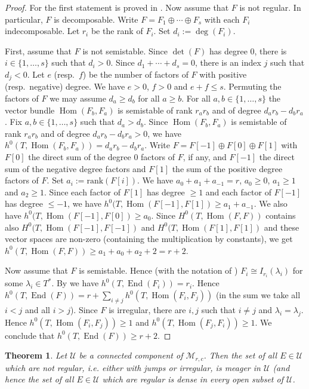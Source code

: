 \documentclass[letterpaper,10pt]{amsart}
\theoremstyle{plain}
\newtheorem{theorem}{Theorem}[]
\theoremstyle{definition}
\newcommand{\enm}[1]{\ensuremath{#1}}          %
\newcommand{\op}[1]{\operatorname{#1}}
\newcommand{\cal}[1]{\mathcal{#1}}
\newcommand{\Mm}{\enm{\cal{M}}}
\newcommand{\Uu}{\enm{\cal{U}}}
\newcommand{\Hom}{\op{Hom}}
\newcommand{\End}{\op{End}}
\begin{document}
\begin{proof}
For the first statement is proved in \cite[Lem.]{FMW}. Now assume that $F$ is not regular. In particular, $F$ is decomposable. Write $F=F_1\oplus \cdots \oplus F_s$ with each $F_i$ indecomposable. Let $r_i$ be the rank of $F_i$. Set $d_i:= \deg(F_i)$. 

First, assume that $F$ is not semistable. Since $\det(F)$ has degree $0$, there is $i\in \{1,\dots,s\}$ such that $d_i>0$. Since $d_1+\cdots +d_s=0$, there is an index $j$ such that $d_j<0$. Let $e$ (resp.~$f$) be the number of factors of $F$ with positive (resp.~negative) degree. We have $e>0$, $f>0$ and $e+f\le s$. 
Permuting the factors of $F$ we may assume $d_a\ge d_b$ for all $a\ge b$. For all $a, b\in \{1,\dots,s\}$ the vector bundle $\Hom(F_b,F_a)$ is semistable of rank $r_ar_b$ and of degree $d_ar_b -d_br_a$. Fix $a,b\in \{1,\dots ,s\}$ such that $d_a>d_b$. Since $\Hom(F_b,F_a)$ is semistable of rank $r_ar_b$ and of degree $d_ar_b -d_br_a>0$, we have $h^0(T,\Hom(F_b,F_a)) =d_ar_b-d_br_a$. Write $F =F[-1]\oplus F[0]\oplus F[1]$ with $F[0]$ the direct sum of the degree $0$ factors of $F$, if any, and $F[-1]$ the direct sum of the negative degree factors and $F[1]$ the sum of the positive degree factors of $F$. Set $a_i:= \mathrm{rank}(F[i])$. We have $a_0+a_1+a_{-1}=r$, $a_0\ge 0$, $a_1\ge 1$ and $a_2\ge 1$. Since each factor of $F[1]$ has degree $\ge 1$ and each factor of $F[-1]$ has degree $\le -1$, we have $h^0(T,\Hom(F[-1],F[1]) \ge a_1+a_{-1}$. We also have $h^0(T,\Hom(F[-1],F[0]) \ge a_0$. Since $H^0(T,\Hom(F,F))$ contains also $H^0(T,\Hom(F[-1],F[-1])$ and $H^0(T,\Hom(F[1],F[1])$ and these vector spaces are non-zero (containing the multiplication by constants), we get $h^0(T,\Hom(F,F)) \ge a_1+a_0+a_2+2=r+2$.


Now assume that $F$ is semistable. Hence (with the notation of \cite[\S 1]{FMW}) $F_i\cong I_{r_i}(\lambda_i)$ for some $\lambda_i\in T^\ast$. By \cite[Lemma 1.13]{FMW} we have $h^0(T,\End(F_i)) =r_i$. Hence $h^0(T,\End(F)) =r +\sum_{i\ne j} h^0(T,\Hom(F_i,F_j))$ (in the sum we take all $i<j$ and all $i>j$).
Since $F$ is irregular, there are $i, j$ such that $i\ne j$ and $\lambda_i =\lambda_j$. Hence $h^0(T,\Hom(F_i,F_j))\ge 1$ and $h^0(T,\Hom(F_j,F_i))\ge 1$.
We conclude that $h^0(T,\End(F)) \ge r+2$.
\end{proof}


\begin{theorem}\label{i1}
Let $\Uu$ be a connected component of $\Mm_{r,c}$. Then the set of all $E\in \Uu$ which are not regular, i.e. either with jumps or irregular, is meager in $\Uu$
(and hence the set of all $E\in \Uu$ which are regular is dense in every open subset of $\Uu$.
\end{theorem}
\end{document}
